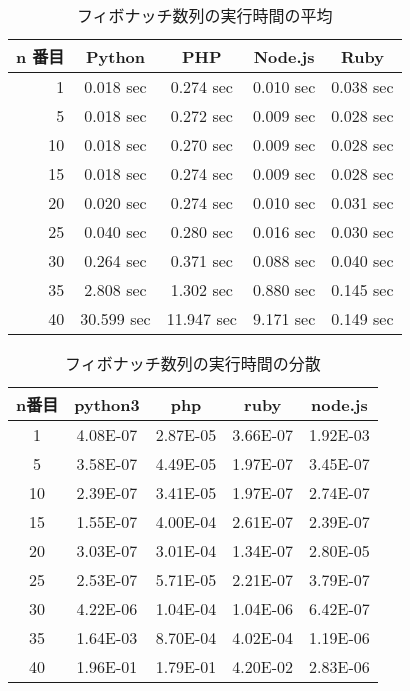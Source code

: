 \begin{table}[tb]
\centering
\begin{tabular}{|r||c|c|c|c|}
\hline
n 番目 & Python & PHP & Node.js & Ruby \\ \hline \hline
1	&0.018 sec	&0.274 sec	&0.010 sec	&0.038 sec \\ \hline
5	&0.018 sec	&0.272 sec	&0.009 sec	&0.028 sec \\ \hline
10	&0.018 sec	&0.270 sec	&0.009 sec	&0.028 sec \\ \hline
15	&0.018 sec	&0.274 sec	&0.009 sec	&0.028 sec \\ \hline
20	&0.020 sec	&0.274 sec	&0.010 sec	&0.031 sec \\ \hline
25	&0.040 sec	&0.280 sec	&0.016 sec	&0.030 sec \\ \hline
30	&0.264 sec	&0.371 sec	&0.088 sec	&0.040 sec \\ \hline
35	&2.808 sec	&1.302 sec	&0.880 sec	&0.145 sec \\ \hline
40	&30.599	sec &11.947 sec	&9.171 sec	&0.149 sec \\ \hline
\end{tabular}
\caption{フィボナッチ数列の実行時間の平均}
\label{table:f-average}
\end{table}

\begin{table}[tb]
\centering
\begin{tabular}{|c||c|c|c|c|}
\hline

n番目	&python3	&php	&ruby	&node.js\\ \hline
1	&4.08E-07	&2.87E-05	&3.66E-07	&1.92E-03\\ \hline
5	&3.58E-07	&4.49E-05	&1.97E-07	&3.45E-07\\ \hline
10	&2.39E-07	&3.41E-05	&1.97E-07	&2.74E-07\\ \hline
15	&1.55E-07	&4.00E-04	&2.61E-07	&2.39E-07\\ \hline
20	&3.03E-07	&3.01E-04	&1.34E-07	&2.80E-05\\ \hline
25	&2.53E-07	&5.71E-05	&2.21E-07	&3.79E-07\\ \hline
30	&4.22E-06	&1.04E-04	&1.04E-06	&6.42E-07\\ \hline
35	&1.64E-03	&8.70E-04	&4.02E-04	&1.19E-06\\ \hline
40	&1.96E-01	&1.79E-01	&4.20E-02	&2.83E-06\\ \hline

\end{tabular}
\caption{フィボナッチ数列の実行時間の分散}
\label{table:f-dispersion}
\end{table}

